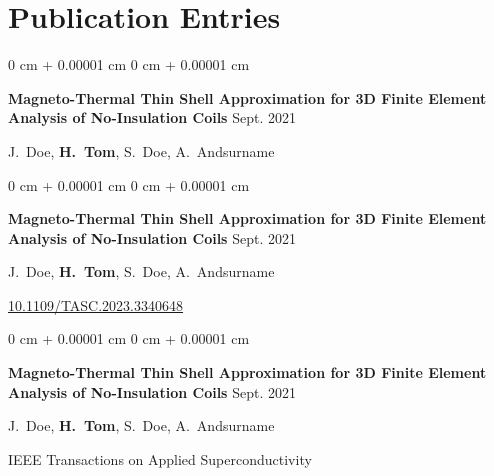 \documentclass[10pt, letterpaper]{article}
\newenvironment{onecolentry}{
    \begin{adjustwidth}{
        0 cm + 0.00001 cm
    }{
        0 cm + 0.00001 cm
    }
}{
    \end{adjustwidth}
} %
\begin{document}
    
    \section{Publication Entries}

        
        \begin{onecolentry}
            \begin{minipage}{\linewidth}
                \textbf{Magneto-Thermal Thin Shell Approximation for 3D Finite Element Analysis of No-Insulation Coils} \hfill Sept. 2021

                \vspace{0.10 cm}

                \mbox{J. Doe}, \mbox{\textbf{H. Tom}}, \mbox{S. Doe}, \mbox{A. Andsurname}
        \end{minipage}
        \end{onecolentry}

        \vspace{0.1 cm}

        \begin{onecolentry}
            \begin{minipage}{\linewidth}
                \textbf{Magneto-Thermal Thin Shell Approximation for 3D Finite Element Analysis of No-Insulation Coils} \hfill Sept. 2021

                \vspace{0.10 cm}

                \mbox{J. Doe}, \mbox{\textbf{H. Tom}}, \mbox{S. Doe}, \mbox{A. Andsurname}
                \vspace{0.10 cm}

        \href{https://doi.org/10.1109/TASC.2023.3340648}{10.1109/TASC.2023.3340648}\end{minipage}
        \end{onecolentry}

        \vspace{0.1 cm}

        \begin{onecolentry}
            \begin{minipage}{\linewidth}
                \textbf{Magneto-Thermal Thin Shell Approximation for 3D Finite Element Analysis of No-Insulation Coils} \hfill Sept. 2021

                \vspace{0.10 cm}

                \mbox{J. Doe}, \mbox{\textbf{H. Tom}}, \mbox{S. Doe}, \mbox{A. Andsurname}
                \vspace{0.10 cm}

        IEEE Transactions on Applied Superconductivity\end{minipage}
        \end{onecolentry}
\end{document}
